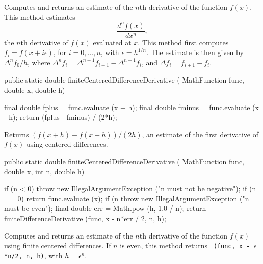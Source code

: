 \begin{tabb}   Computes and returns an estimate
 of the $n$th derivative of the
 function $f(x)$.
 This method estimates
 \[\frac{d^nf(x)}{dx^n},\]
 the $n$th derivative of $f(x)$
 evaluated at $x$.
 This method first computes
 $f_i=f(x+i\epsilon)$, for $i=0,\ldots,n$, with
 $\epsilon=h^{1/n}$.
 The estimate is then given by
 $\Delta^nf_0/h$, where
 $\Delta^nf_i=\Delta^{n-1}f_{i+1} - \Delta^{n-1}f_i$, and
 $\Delta f_i = f_{i+1} - f_i$.
\end{tabb}
\begin{htmlonly}
\end{htmlonly}
\begin{code}

   public static double finiteCenteredDifferenceDerivative (
                 MathFunction func, double x, double h)\begin{hide} {
      final double fplus = func.evaluate (x + h);
      final double fminus = func.evaluate (x - h);
      return (fplus - fminus) / (2*h);
   }\end{hide}
\end{code}
\begin{tabb}   Returns $(f(x + h) - f(x - h))/(2h)$,
 an estimate of the first derivative of $f(x)$
 using centered differences.
\end{tabb}
\begin{htmlonly}
\end{htmlonly}
\begin{code}

   public static double finiteCenteredDifferenceDerivative (
                 MathFunction func, double x, int n, double h)\begin{hide} {
      if (n < 0)
         throw new IllegalArgumentException
         ("n must not be negative");
      if (n == 0)
         return func.evaluate (x);
      if (n %
         throw new IllegalArgumentException ("n must be even");
      final double err = Math.pow (h, 1.0 / n);
      return finiteDifferenceDerivative (func, x - n*err / 2, n, h);
   }\end{hide}
\end{code}
\begin{tabb}   Computes and returns an estimate of the $n$th derivative of the
 function $f(x)$ using finite centered differences.
 If $n$ is even, this method returns
~\texttt{(func, x - $\epsilon$*n/2, n, h)}, with $h=\epsilon^n$.
\end{tabb}
